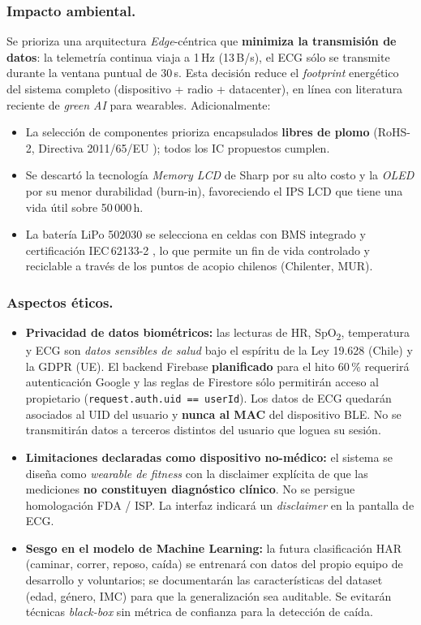 \documentclass[letterpaper,11pt]{article}
\begin{document}
\subsubsection{Impacto ambiental.} Se prioriza una arquitectura \textit{Edge}-céntrica que
\textbf{minimiza la transmisión de datos}: la telemetría continua viaja a 1\,Hz (13\,B/s),
el ECG sólo se transmite durante la ventana puntual de 30\,s. Esta decisión reduce el
\textit{footprint} energético del sistema completo (dispositivo + radio + datacenter),
en línea con literatura reciente de \textit{green AI} para wearables. Adicionalmente:
\begin{itemize}
    \item La selección de componentes prioriza encapsulados \textbf{libres de plomo} (RoHS-2,
    Directiva 2011/65/EU \cite{rohs}); todos los IC propuestos cumplen.
    \item Se descartó la tecnología \textit{Memory LCD} de Sharp por su alto costo y la
    \textit{OLED} por su menor durabilidad (burn-in), favoreciendo el IPS LCD que tiene una
    vida útil sobre 50\,000\,h.
    \item La batería LiPo 502030 se selecciona en celdas con BMS integrado y certificación
    IEC\,62133-2 \cite{en62133}, lo que permite un fin de vida controlado y reciclable a
    través de los puntos de acopio chilenos (Chilenter, MUR).
\end{itemize}

\subsubsection{Aspectos éticos.}
\begin{itemize}
    \item \textbf{Privacidad de datos biométricos:} las lecturas de HR, SpO\textsubscript{2}, temperatura
    y ECG son \textit{datos sensibles de salud} bajo el espíritu de la Ley 19.628 (Chile) y la
    GDPR (UE). El backend Firebase \textbf{planificado} para el hito 60\,\% requerirá
    autenticación Google y las reglas de Firestore sólo permitirán acceso al propietario
    (\texttt{request.auth.uid == userId}). Los datos de ECG quedarán asociados al UID del
    usuario y \textbf{nunca al MAC} del dispositivo BLE\@. No se transmitirán datos a
    terceros distintos del usuario que loguea su sesión.
    \item \textbf{Limitaciones declaradas como dispositivo no-médico:} el sistema se diseña
    como \textit{wearable de fitness} con la disclaimer explícita de que las mediciones
    \textbf{no constituyen diagnóstico clínico}. No se persigue homologación FDA / ISP. La
    interfaz indicará un \textit{disclaimer} en la pantalla de ECG.
    \item \textbf{Sesgo en el modelo de Machine Learning:} la futura clasificación HAR (caminar,
    correr, reposo, caída) se entrenará con datos del propio equipo de desarrollo y
    voluntarios; se documentarán las características del dataset (edad, género, IMC) para que
    la generalización sea auditable. Se evitarán técnicas \textit{black-box} sin métrica de
    confianza para la detección de caída.
\end{itemize}
\end{document}
